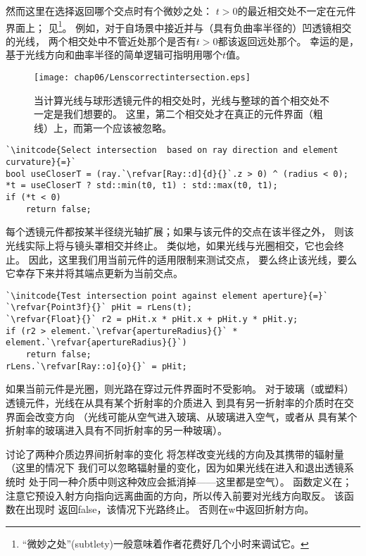 然而这里在选择返回哪个交点时有个微妙之处：
$t>0$的最近相交处不一定在元件界面上；
见\footnote{“微妙之处”(subtlety)一般意味着作者花费好几个小时来调试它。}。
例如，对于自场景中接近并与（具有负曲率半径的）凹透镜相交的光线，
两个相交处中不管近处那个是否有$t>0$都该返回远处那个。
幸运的是，基于光线方向和曲率半径的简单逻辑可指明用哪个$t$值。
\begin{figure}[htbp]
    \centering\texttt{[image: chap06/Lenscorrectintersection.eps]}
    \caption{当计算光线与球形透镜元件的相交处时，光线与整球的首个相交处不一定是我们想要的。
        这里，第二个相交处才在真正的元件界面（粗线）上，而第一个应该被忽略。}
    \label{fig:6.19}
\end{figure}
\begin{lstlisting}
`\initcode{Select intersection  based on ray direction and element curvature}{=}`
bool useCloserT = (ray.`\refvar[Ray::d]{d}{}`.z > 0) ^ (radius < 0);
*t = useCloserT ? std::min(t0, t1) : std::max(t0, t1);
if (*t < 0)
    return false;
\end{lstlisting}

每个透镜元件都按某半径绕光轴扩展；如果与该元件的交点在该半径之外，
则该光线实际上将与镜头罩相交并终止。
类似地，如果光线与光圈相交，它也会终止。
因此，这里我们用当前元件的适用限制来测试交点，
要么终止该光线，要么它幸存下来并将其端点更新为当前交点。
\begin{lstlisting}
`\initcode{Test intersection point against element aperture}{=}`
`\refvar{Point3f}{}` pHit = rLens(t);
`\refvar{Float}{}` r2 = pHit.x * pHit.x + pHit.y * pHit.y;
if (r2 > element.`\refvar{apertureRadius}{}` * element.`\refvar{apertureRadius}{}`)
    return false;
rLens.`\refvar[Ray::o]{o}{}` = pHit;
\end{lstlisting}

如果当前元件是光圈，则光路在穿过元件界面时不受影响。
对于玻璃（或塑料）透镜元件，光线在从具有某个折射率的介质进入
到具有另一折射率的介质时在交界面会改变方向
（光线可能从空气进入玻璃、从玻璃进入空气，或者从
具有某个折射率的玻璃进入具有不同折射率的另一种玻璃）。

讨论了两种介质边界间折射率的变化
将怎样改变光线的方向及其携带的辐射量（这里的情况下
我们可以忽略辐射量的变化，因为如果光线在进入和退出透镜系统时
处于同一种介质中则这种效应会抵消掉——这里都是空气）。
函数定义在；
注意它预设入射方向指向远离曲面的方向，所以传入前要对光线方向取反。
该函数在出现时
返回{\ttfamily false}，该情况下光路终止。
否则在{\ttfamily w}中返回折射方向。

